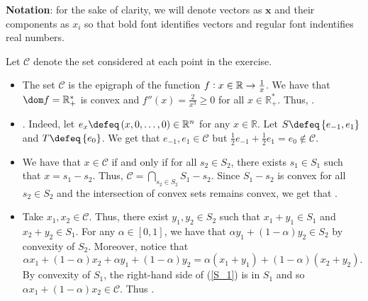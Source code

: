 \documentclass{article}
\begin{document}
    \textbf{Notation}: for the sake of 
    clarity, we will denote vectors
    as $\mathbf{x}$
    and their components as
    $x_{i}$ so that bold
    font identifies vectors
    and regular font
    indentifies real numbers. 
    
    \begin{exo}
    \end{exo} 
    Let $\mathcal{C}$ denote the set
    considered at each point in the exercise.
    \begin{itemize}
        \item The set $\mathcal{C}$ is the epigraph
            of the function
            $f \vcentcolon x \in \mathbb{R}
             \rightarrow \frac{1}{x}$.
             We have that $\dom f = \mathbb{R}_{+}^{*}$
             is convex and 
             $f''\left(x\right) = \frac{2}{x^{3}} \geq 0$
             for all $x \in \mathbb{R}_{+}^{*}$.
             Thus, .
         \item {}.
             Indeed, let $e_{x} \defeq \left(x, 0, \ldots, 0\right)
             \in \mathbb{R}^{n}$ for
             any $x \in \mathbb{R}$.
             Let $S \defeq \left\{e_{-1},
             e_{1}\right\}$ and
             $T \defeq \left\{e_{0}\right\}$.
             We get that $e_{-1}, e_1 \in \mathcal{C}$
             but $\frac{1}{2} e_{-1} + \frac{1}{2} e_{1} = e_0
             \not\in \mathcal{C}$.
         \item We have that
             $x \in \mathcal{C}$ 
             if and only if
             for all $s_2 \in S_2$,
             there exists $s_1 \in S_1$
             such that $x = s_1 - s_2$.
             Thus, $\mathcal{C} = \bigcap_{
             s_2 \in S_2}
             S_{1} - s_2$. Since $S_1 - s_2$ 
             is convex for all $s_2 \in S_2$ 
             and the intersection
             of convex sets remains 
             convex, we get that
             .
        \item Take $x_1, x_2 \in \mathcal{C}$.
            Thus, there exist
            $y_1, y_2 \in S_2$ 
            such that 
            $x_1 + y_1 \in S_1$ 
            and $x_2 + y_2 \in S_1$.
            For any $\alpha \in \left[0, 1\right]$,
            we have that
            $\alpha y_1 + \left(1 - \alpha\right)y_2
            \in S_2$ by convexity
            of $S_2$.
            Moreover, notice that
            \begin{equation}
                \label{S_1}
                \alpha x_1 + \left(1 - \alpha\right) x_2
                 + \alpha y_1 + \left(1 - \alpha\right) y_2 = 
                 \alpha\left(x_1 + y_1\right) +
                 \left(1 - \alpha\right)\left(x_2 + y_2\right).
            \end{equation}
            By convexity of $S_1$,
            the right-hand side of 
            (\ref{S_1}) is in $S_1$
            and so $\alpha x_1 + \left(1 - \alpha\right) x_2
            \in \mathcal{C}$.
            Thus .
     \end{itemize}
\end{document}
